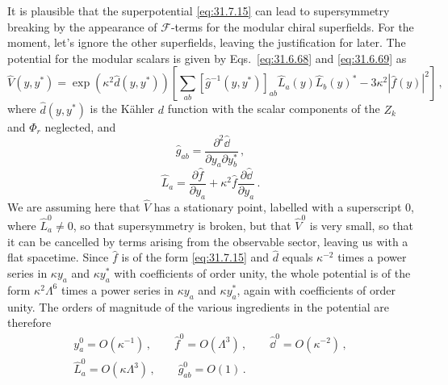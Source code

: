 It is plausible that the superpotential \eqref{eq:31.7.15} can lead to
supersymmetry breaking by the appearance of \(\mathcal F\)-terms for the
modular chiral superfields. For the moment, let's ignore the other
superfields, leaving the justification for later. The potential for the
modular scalars is given by Eqs.~\eqref{eq:31.6.68} and
\eqref{eq:31.6.69} as
\begin{equation}
  \widehat V(y,y^*)
  =\exp\left(\kappa^2\widehat d(y,y^*)\right)
  \left[
    \sum_{ab}[\widehat g^{-1}(y,y^*)]_{ab}
      \widehat L_a(y)\widehat L_b(y)^*
    -3\kappa^2|\widehat f(y)|^2
  \right]\,,
  \tag{31.7.16}\label{eq:31.7.16}
\end{equation}
where \(\widehat d(y,y^*)\) is the Kähler \(d\) function with the scalar
components of the \(Z_k\) and \(\Phi_r\) neglected, and
\begin{equation}
  \widehat g_{ab}
  =\frac{\partial^2\widehat \dd}{\partial y_a\partial y_b^*}\,,
  \tag{31.7.17}\label{eq:31.7.17}
\end{equation}
\begin{equation}
  \widehat L_a
  =\frac{\partial\widehat f}{\partial y_a}
   +\kappa^2\widehat f\frac{\partial\widehat \dd}{\partial y_a}\,.
  \tag{31.7.18}\label{eq:31.7.18}
\end{equation}
We are assuming here that \(\widehat V\) has a stationary point, labelled
with a superscript 0, where \(\widehat L_a^0\ne0\), so that supersymmetry is
broken, but that \(\widehat V^0\) is very small, so that it can be cancelled
by terms arising from the observable sector, leaving us with a flat
spacetime. Since \(\widehat f\) is of the form \eqref{eq:31.7.15} and
\(\widehat d\) equals \(\kappa^{-2}\) times a power series in \(\kappa y_a\)
and \(\kappa y_a^*\) with coefficients of order unity, the whole potential
is of the form \(\kappa^2\Lambda^6\) times a power series in \(\kappa y_a\)
and \(\kappa y_a^*\), again with coefficients of order unity. The orders of
magnitude of the various ingredients in the potential are therefore
\begin{equation}
  \begin{gathered}
  y_a^0=O(\kappa^{-1})\,,\qquad
  \widehat f^0=O(\Lambda^3)\,,\qquad
  \widehat \dd^0=O(\kappa^{-2})\,,
  \\
  \widehat L_a^0=O(\kappa\Lambda^3)\,,\qquad
  \widehat g_{ab}^0=O(1)\,.
  \end{gathered}
  \tag{31.7.19}\label{eq:31.7.19}
\end{equation}

